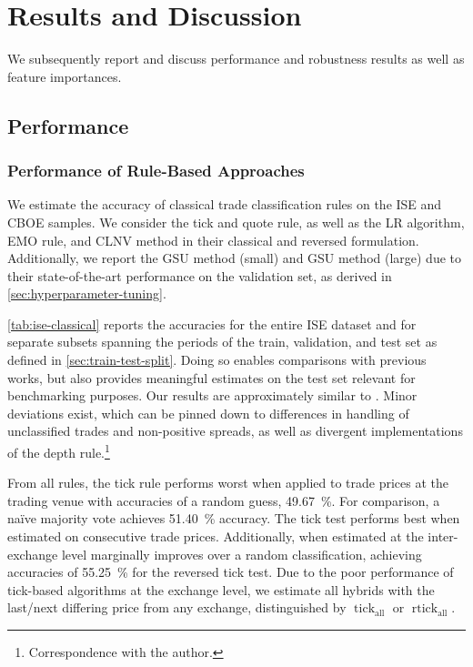 \section{Results and Discussion}\label{sec:results}

We subsequently report and discuss performance and robustness results as well as feature importances. 

\subsection{Performance}\label{sec:performance-results-discussion}


\subsubsection{Performance of Rule-Based Approaches}\label{sec:result-of-rule-based-approaches}

We estimate the accuracy of classical trade classification rules on the \gls{ISE} and \gls{CBOE} samples. We consider the tick and quote rule, as well as the \gls{LR} algorithm, \gls{EMO} rule, and \gls{CLNV} method in their classical and reversed formulation. Additionally, we report the \gls{GSU} method (small) and \gls{GSU} method (large) due to their state-of-the-art performance on the validation set, as derived in \cref{sec:hyperparameter-tuning}.

\cref{tab:ise-classical} reports the accuracies for the entire \gls{ISE} dataset and for separate subsets spanning the periods of the train, validation, and test set as defined in \cref{sec:train-test-split}. Doing so enables comparisons with previous works, but also provides meaningful estimates on the test set relevant for benchmarking purposes. Our results are approximately similar to \textcite[][40--42]{grauerOptionTradeClassification2022}. Minor deviations exist, which can be pinned down to differences in handling of unclassified trades and non-positive spreads, as well as divergent implementations of the depth rule.\footnote{Correspondence with the author.}

From all rules, the tick rule performs worst when applied to trade prices at the trading venue with accuracies of a random guess, \SI{49.67}{\percent}. For comparison, a na\"ive majority vote achieves \SI{51.40}{\percent} accuracy. The tick test performs best when estimated on consecutive trade prices. Additionally, when estimated at the inter-exchange level marginally improves over a random classification, achieving accuracies of \SI{55.25}{\percent} for the reversed tick test. Due to the poor performance of tick-based algorithms at the exchange level, we estimate all hybrids with the last/next differing price from any exchange, distinguished by $\operatorname{tick}_{\mathrm{all}}$ or $\operatorname{rtick}_{\mathrm{all}}$.

